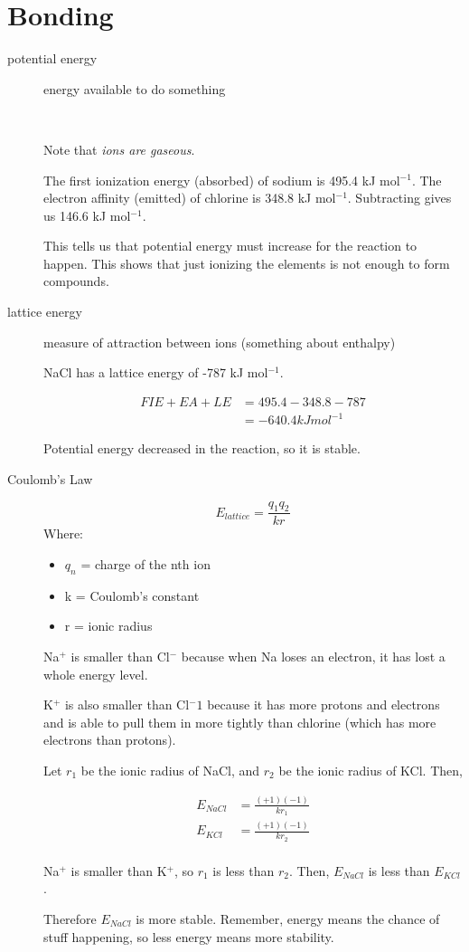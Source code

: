 \documentclass[a4paper, 8pt]{memoir}
\begin{document}
\chapter{Bonding}
\begin{description}
\item[potential energy] energy available to do something

 \\

Note that \emph{ions are gaseous}.

The first ionization energy (absorbed) of sodium is 495.4 kJ mol$^{-1}$. The electron affinity (emitted) of chlorine is 348.8 kJ mol$^{-1}$. Subtracting gives us 146.6 kJ mol$^{-1}$.

This tells us that potential energy must increase for the reaction to happen. This shows that just ionizing the elements is not enough to form compounds.

\item[lattice energy] measure of attraction between ions (something about enthalpy)

NaCl has a lattice energy of -787 kJ mol$^{-1}$.

\begin{align*}
FIE + EA + LE &= 495.4 - 348.8 - 787 \\
&= -640.4 kJ mol^{-1}
\end{align*}

Potential energy decreased in the reaction, so it is stable.

\item[Coulomb's Law] \begin{equation}
E_{lattice} = \frac{q_1 q_2}{k r}
\end{equation}
Where:
\begin{itemize}
\item $q_n$ = charge of the nth ion
\item k = Coulomb's constant
\item r = ionic radius
\end{itemize}

Na$^+$ is smaller than Cl$^-$ because when Na loses an electron, it has lost a whole energy level.

K$^+$ is also smaller than Cl$^-1$ because it has more protons and electrons and is able to pull them in more tightly than chlorine (which has more electrons than protons).

Let $r_1$ be the ionic radius of NaCl, and $r_2$ be the ionic radius of KCl. Then,

\begin{align*}
E_{NaCl} &= \frac{(+1)(-1)}{kr_1} \\
E_{KCl} &= \frac{(+1)(-1)}{kr_2} \\
\end{align*}

Na$^+$ is smaller than K$^+$, so $r_1$ is less than $r_2$. Then, $E_{NaCl}$ is less than $E_{KCl}$.

Therefore $E_{NaCl}$ is more stable. Remember, energy means the chance of stuff happening, so less energy means more stability.
\end{description}
\end{document}
